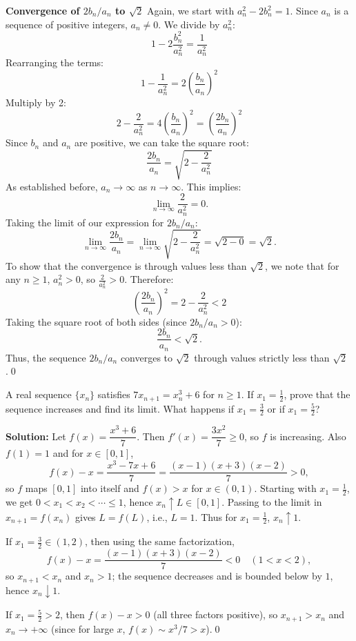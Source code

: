 \textbf{Convergence of $2b_n/a_n$ to $\sqrt{2}$}
Again, we start with $a_n^2 - 2b_n^2 = 1$. Since $a_n$ is a sequence of positive integers, $a_n \neq 0$. We divide by $a_n^2$:
\[ 1 - 2\frac{b_n^2}{a_n^2} = \frac{1}{a_n^2} \]
Rearranging the terms:
\[ 1 - \frac{1}{a_n^2} = 2\left(\frac{b_n}{a_n}\right)^2 \]
Multiply by 2:
\[ 2 - \frac{2}{a_n^2} = 4\left(\frac{b_n}{a_n}\right)^2 = \left(\frac{2b_n}{a_n}\right)^2 \]
Since $b_n$ and $a_n$ are positive, we can take the square root:
\[ \frac{2b_n}{a_n} = \sqrt{2 - \frac{2}{a_n^2}} \]
As established before, $a_n \to \infty$ as $n \to \infty$. This implies:
\[ \lim_{n \to \infty} \frac{2}{a_n^2} = 0. \]
Taking the limit of our expression for $2b_n/a_n$:
\[ \lim_{n \to \infty} \frac{2b_n}{a_n} = \lim_{n \to \infty} \sqrt{2 - \frac{2}{a_n^2}} = \sqrt{2-0} = \sqrt{2}. \]
To show that the convergence is through values less than $\sqrt{2}$, we note that for any $n \geq 1$, $a_n^2 > 0$, so $\frac{2}{a_n^2} > 0$. Therefore:
\[ \left(\frac{2b_n}{a_n}\right)^2 = 2 - \frac{2}{a_n^2} < 2 \]
Taking the square root of both sides (since $2b_n/a_n > 0$):
\[ \frac{2b_n}{a_n} < \sqrt{2}. \]
Thus, the sequence $2b_n/a_n$ converges to $\sqrt{2}$ through values strictly less than $\sqrt{2}$.\qed
\medskip



\begin{problembox}
A real sequence $\{x_n\}$ satisfies $7x_{n+1} = x_n^3 + 6$ for $n \geq 1$. If $x_1 = \frac{1}{2}$, prove that the sequence increases and find its limit. What happens if $x_1 = \frac{3}{2}$ or if $x_1 = \frac{5}{2}$?
\end{problembox}

\noindent\textbf{Solution:}
Let $f(x)=\dfrac{x^3+6}{7}$. Then $f'(x)=\dfrac{3x^2}{7}\ge 0$, so $f$ is increasing. Also $f(1)=1$ and for $x\in[0,1]$,
\[
f(x)-x=\frac{x^3-7x+6}{7}=\frac{(x-1)(x+3)(x-2)}{7}>0,
\]
so $f$ maps $[0,1]$ into itself and $f(x)>x$ for $x\in(0,1)$. Starting with $x_1=\tfrac12$, we get $0<x_1<x_2<\cdots\le 1$, hence $x_n\uparrow L\in[0,1]$. Passing to the limit in $x_{n+1}=f(x_n)$ gives $L=f(L)$, i.e., $L=\textbf{$1$}$. Thus for $x_1=\tfrac12$, $x_n\uparrow \textbf{$1$}$.

If $x_1=\tfrac32\in(1,2)$, then using the same factorization,
\[
f(x)-x=\frac{(x-1)(x+3)(x-2)}{7}<0\quad(1<x<2),
\]
so $x_{n+1}<x_n$ and $x_n>1$; the sequence decreases and is bounded below by $1$, hence $x_n\downarrow \textbf{$1$}$.

If $x_1=\tfrac52>2$, then $f(x)-x>0$ (all three factors positive), so $x_{n+1}>x_n$ and $x_n\to+\infty$ (since for large $x$, $f(x)\sim x^3/7>x$).\qed




